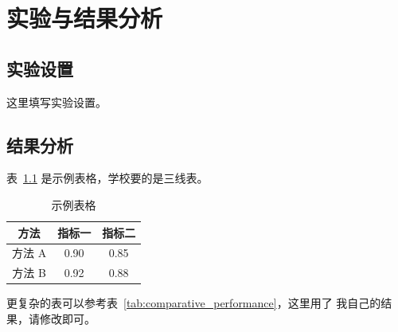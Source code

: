 \chapter{实验与结果分析}
\label{chapter:experiment}

\section{实验设置}
这里填写实验设置。

\section{结果分析}
表~\ref{tab:example} 是示例表格，学校要的是三线表。

\begin{table}[H]
    \centering
    \caption{示例表格}
    \label{tab:example}
    \begin{tabular}{ccc}
        \toprule
        方法 & 指标一 & 指标二 \\
        \midrule
        方法 A & 0.90 & 0.85 \\
        方法 B & 0.92 & 0.88 \\
        \bottomrule
    \end{tabular}
\end{table}

更复杂的表可以参考表~\ref{tab:comparative_performance}，这里用了 我自己的结果，请修改即可。

